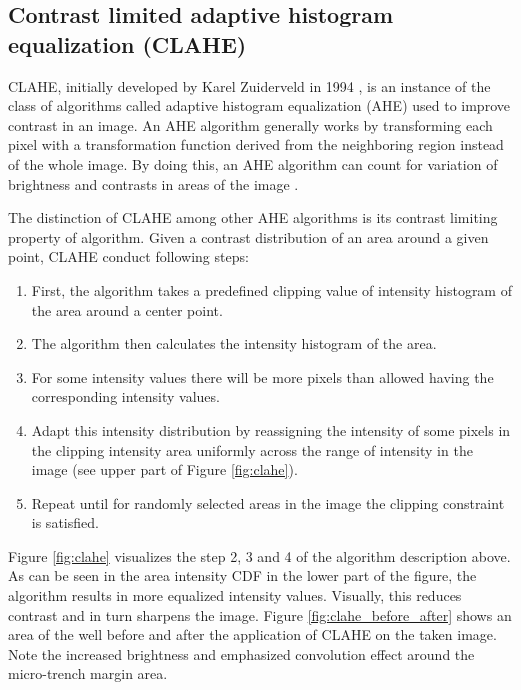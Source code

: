 \documentclass[pdftex,12pt,a4paper]{report}
\begin{document}
\subsection{Contrast limited adaptive histogram equalization (CLAHE)}
\label{subsection:clahe}

CLAHE, initially developed by Karel Zuiderveld in 1994 \cite{zuiderveld1994contras}, is an instance of the class of algorithms called adaptive histogram equalization (AHE) used to improve contrast in an image. An AHE algorithm generally works by transforming each pixel with a transformation function derived from the neighboring region instead of the whole image.  By doing this, an AHE algorithm can count for variation of  brightness and contrasts in areas of the image \cite{pizer1987adaptive}.

The distinction of CLAHE among other AHE algorithms is its contrast limiting property of algorithm. Given a contrast distribution of an area around a given point,  CLAHE conduct following steps:

\begin{enumerate}
\item First, the algorithm takes a predefined clipping value of intensity histogram of the area around a center point.
\item The algorithm then calculates the intensity histogram of the area.
\item For some intensity values there will be more pixels than allowed having the corresponding intensity values.
\item Adapt this intensity distribution by reassigning the intensity of some pixels in the clipping intensity area uniformly across the range of intensity in the image (see upper part of Figure \ref{fig:clahe}).
\item Repeat until for randomly selected areas in the image the clipping constraint is satisfied.
\end{enumerate}

Figure \ref{fig:clahe} visualizes the step 2, 3 and 4 of the algorithm description above. As can be seen in the area intensity CDF in the lower part of the figure, the algorithm results in more equalized intensity values. Visually, this reduces contrast and in turn sharpens the image. Figure \ref{fig:clahe_before_after} shows an area of the well before and after the application of CLAHE on the taken image. Note the increased brightness and emphasized  convolution effect around the micro-trench margin area.
\end{document}

